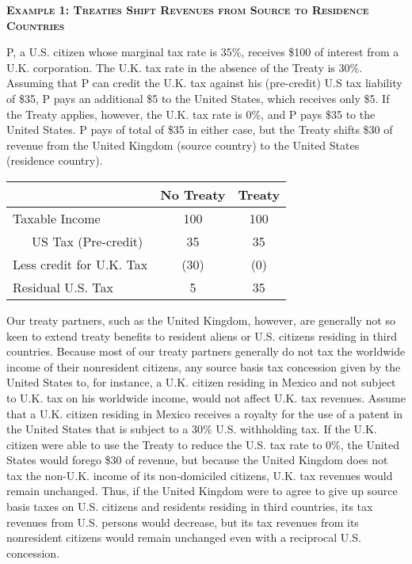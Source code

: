 	\begin{framed}
		\begin{center}
				\textsc{\textbf{Example 1:  Treaties Shift Revenues from Source to Residence Countries}}\\
		\end{center}
P, a U.S. citizen whose marginal tax rate is 35\%, receives  \$100 of interest from a U.K. corporation.  The U.K. tax rate in the absence of the Treaty is 30\%.  Assuming that P can credit the U.K. tax against his (pre-credit) U.S tax liability of \$35, P pays an additional \$5 to the United States, which receives only \$5.  If the Treaty applies, however, the U.K. tax rate is 0\%, and P pays \$35 to the United States.  P pays of total of \$35 in either case, but the Treaty shifts \$30 of revenue from the United Kingdom (source country) to the United States (residence country). 

 	\begin{center}
	  \begin{tabular}{l c c}
  		& No Treaty & Treaty\\
  	\hline
 		 Taxable Income & 100 & 100 \\
  		\ \ \ US Tax (Pre-credit) & 35 & 35 \\
 		 Less credit for U.K. Tax & (30) & (0) \\
  		Residual U.S. Tax & 5 & 35 \\
  		\hline
    		\end{tabular}
   	\end{center} 
   		\end{framed}
Our treaty partners, such as the United Kingdom, however, are generally not so keen to extend treaty benefits to resident aliens or U.S. citizens residing in third countries.  Because most of our treaty partners generally do not tax the worldwide income of their nonresident citizens, any source basis tax concession given by the United States to, for instance, a U.K. citizen residing in Mexico and not subject to U.K. tax on his worldwide income, would not affect U.K. tax revenues.  Assume that a U.K. citizen residing in Mexico receives a royalty for the use of a patent in the United States that is subject to a 30\% U.S. withholding tax.  If the U.K. citizen were able to use the Treaty to reduce the U.S. tax rate to 0\%, the United States would forego \$30 of revenue, but because the United Kingdom does not tax the non-U.K. income of its non-domiciled citizens, U.K. tax revenues would remain unchanged.  Thus, if the United Kingdom were to agree to give up source basis taxes on U.S. citizens and residents residing in third countries, its tax revenues from U.S. persons would decrease, but its tax revenues from its nonresident citizens would remain unchanged even with a reciprocal U.S. concession. 

